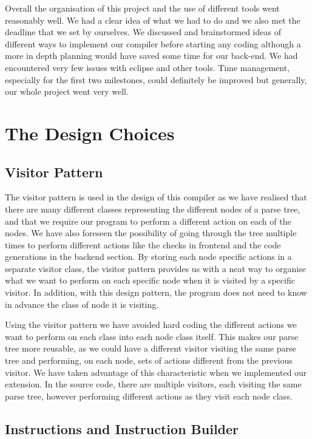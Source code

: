 \documentclass[11pt]{article}
\begin{document}
\medskip

Overall the organisation of this project and the use of different tools went reasonably well. We had a clear idea of what we had to do and we also met the deadline that we set by ourselves. We discussed and brainstormed ideas of different ways to implement our compiler before starting any coding although a more in depth planning would have saved some time for our back-end. We had encountered very few issues with eclipse and other tools. Time management, especially for the first two milestones, could definitely be improved but generally, our whole project went very well. 

\section{The Design Choices}

\subsection{Visitor Pattern}

The visitor pattern is used in the design of this compiler as we have realised that there are many different classes representing the different nodes of a parse tree, and that we require our program to perform a different action on each of the nodes. We have also foreseen the possibility of going through the tree multiple times to perform different actions like the checks in frontend and the code generations in the backend section. By storing each node specific actions in a separate visitor class, the visitor pattern provides us with a neat way to organise what we want to perform on each specific node when it is visited by a specific visitor. In addition, with this design pattern, the program does not need to know in advance the class of node it is visiting. 

\medskip

Using the visitor pattern we have avoided hard coding the different actions we want to perform on each class into each node class itself. This makes our parse tree more reusable, as we could have a different visitor visiting the same parse tree and performing, on each node, sets of actions different from the previous visitor. We have taken advantage of this characteristic when we implemented our extension. In the source code, there are multiple visitors, each visiting the same parse tree, however performing different actions as they visit each node class. 

\subsection{Instructions and Instruction Builder}
\end{document}
